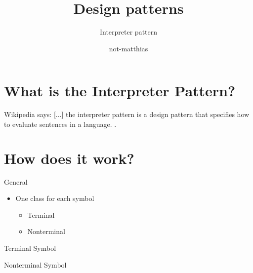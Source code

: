 

\usepackage{todonotes}

\title{Design patterns}
\subtitle{Interpreter pattern}
\author{not-matthias}


    \begin{frame}
        \maketitle
    \end{frame}

    \section{What is the Interpreter Pattern?}

    \begin{frame}
        \begin{block}{Wikipedia says: }
            [...] the interpreter pattern is a design pattern that specifies how to evaluate sentences in a language. \cite{wikipedia_design_patterns}.
        \end{block}
    \end{frame}

    \section{How does it work?}

    \begin{frame}{General}
        \begin{itemize}
            \item One class for each symbol
            \begin{itemize}
                \item Terminal
                \item Nonterminal
            \end{itemize}
        \end{itemize}
    \end{frame}

    \begin{frame}{Terminal Symbol}
    \end{frame}

    \begin{frame}{Nonterminal Symbol}
    \end{frame}

